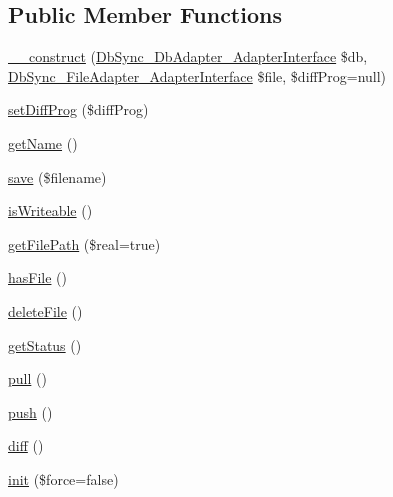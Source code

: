 \subsection*{Public Member Functions}
\begin{DoxyCompactItemize}
\item 
\hyperlink{classDbSync__Model__AbstractModel_a465d0b66eecc5bafe16c60a091818300}{\_\-\_\-construct} (\hyperlink{interfaceDbSync__DbAdapter__AdapterInterface}{DbSync\_\-DbAdapter\_\-AdapterInterface} \$db, \hyperlink{interfaceDbSync__FileAdapter__AdapterInterface}{DbSync\_\-FileAdapter\_\-AdapterInterface} \$file, \$diffProg=null)
\item 
\hyperlink{classDbSync__Model__AbstractModel_a3e74113d284bb77851210687c81132f0}{setDiffProg} (\$diffProg)
\item 
\hyperlink{classDbSync__Model__AbstractModel_a96803106cf4d9cd9397b36d51f968d48}{getName} ()
\item 
\hyperlink{classDbSync__Model__AbstractModel_aefc6efadc58c0252f5b40aaf1dd6ca3e}{save} (\$filename)
\item 
\hyperlink{classDbSync__Model__AbstractModel_a7c06c50106b8d6ed078a0c418daad2f6}{isWriteable} ()
\item 
\hyperlink{classDbSync__Model__AbstractModel_af11e8e35d3bf6119f2954836b844c5e4}{getFilePath} (\$real=true)
\item 
\hyperlink{classDbSync__Model__AbstractModel_ad2e2053df76dca54927230109adadb32}{hasFile} ()
\item 
\hyperlink{classDbSync__Model__AbstractModel_ad3165926fb191710d68d987548bc377a}{deleteFile} ()
\item 
\hyperlink{classDbSync__Model__AbstractModel_a2bde0fab39d14e31f2fb38c3401ac092}{getStatus} ()
\item 
\hyperlink{classDbSync__Model__AbstractModel_aa31931e01689ce7f5841a8fb268a753c}{pull} ()
\item 
\hyperlink{classDbSync__Model__AbstractModel_a93a3912dbc5e1667fde4dea420e36470}{push} ()
\item 
\hyperlink{classDbSync__Model__AbstractModel_aa340f69f9ed1f60df7238bc971db6489}{diff} ()
\item 
\hyperlink{classDbSync__Model__AbstractModel_a6dc082b13e12f68902dd659bc38c8865}{init} (\$force=false)
\end{DoxyCompactItemize}
